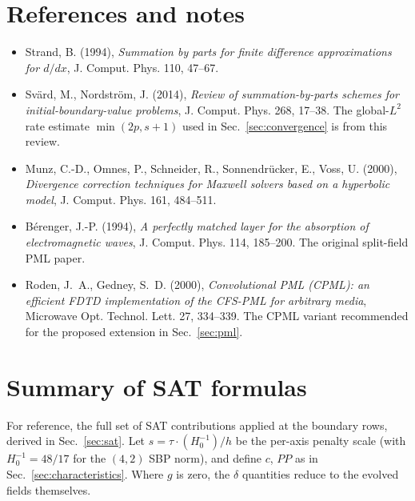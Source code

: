 \documentclass[11pt]{article}
\begin{document}
\section{References and notes}

\begin{itemize}
\item Strand, B. (1994), \emph{Summation by parts for finite difference
  approximations for $d/dx$}, J. Comput. Phys. 110, 47--67.
\item Svärd, M., Nordström, J. (2014), \emph{Review of summation-by-parts
  schemes for initial-boundary-value problems}, J. Comput. Phys. 268,
  17--38. The global-$L^2$ rate estimate
  $\min(2p, s+1)$ used in Sec.~\ref{sec:convergence} is from this
  review.
\item Munz, C.-D., Omnes, P., Schneider, R., Sonnendrücker, E., Voss, U.
  (2000), \emph{Divergence correction techniques for Maxwell solvers
  based on a hyperbolic model}, J. Comput. Phys. 161, 484--511.
\item B\'erenger, J.-P. (1994), \emph{A perfectly matched layer for the
  absorption of electromagnetic waves}, J. Comput. Phys. 114,
  185--200. The original split-field PML paper.
\item Roden, J.~A., Gedney, S.~D. (2000), \emph{Convolutional PML
  (CPML): an efficient FDTD implementation of the CFS-PML for
  arbitrary media}, Microwave Opt. Technol. Lett. 27, 334--339.
  The CPML variant recommended for the proposed extension in
  Sec.~\ref{sec:pml}.
\end{itemize}

\appendix

\section{Summary of SAT formulas}
\label{app:sat-formulas}

For reference, the full set of SAT contributions applied at the
boundary rows, derived in Sec.~\ref{sec:sat}. Let
$s = \tau \cdot (H^{-1}_0)/h$ be the per-axis penalty scale
(with $H^{-1}_0 = 48/17$ for the $(4,2)$ SBP norm), and define $c$,
$PP$ as in Sec.~\ref{sec:characteristics}. Where $g$ is zero, the
$\delta$ quantities reduce to the evolved fields themselves.
\end{document}
